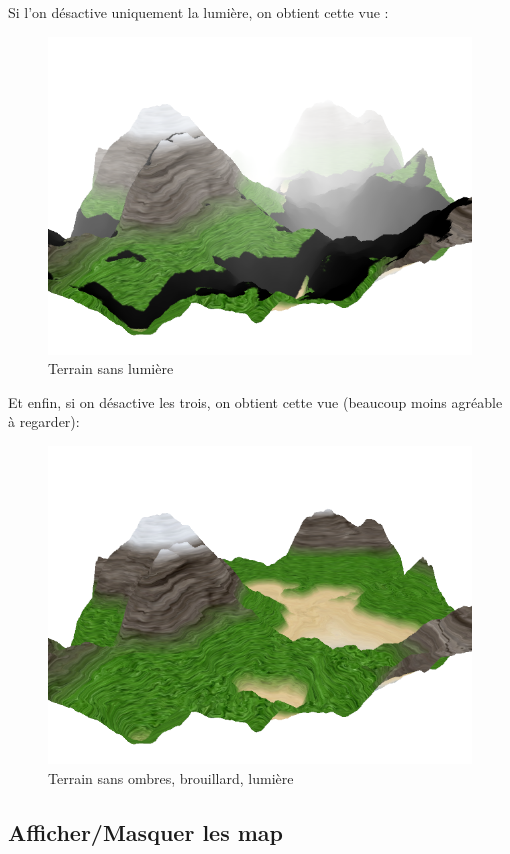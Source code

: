 \documentclass{article}
\begin{document}
Si l'on désactive uniquement la lumière, on obtient cette vue :

\begin{figure}[h]
	\center
	\includegraphics[scale=0.30]{screen4.png}
	\caption{Terrain sans lumière}
\end{figure}
\newpage
Et enfin, si on désactive les trois, on obtient cette vue (beaucoup moins agréable à regarder):
\begin{figure}[h]
	\center
	\includegraphics[scale=0.30]{screen5.png}
	\caption{Terrain sans ombres, brouillard, lumière}
\end{figure}

\subsection{Afficher/Masquer les map}
\end{document}
